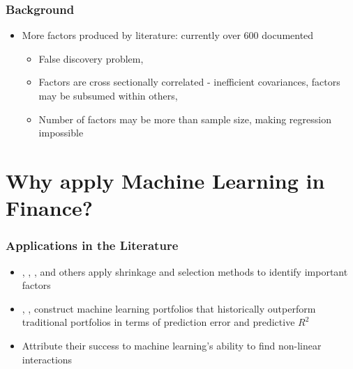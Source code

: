 \documentclass[]{beamer}
\begin{document}
\begin{frame}
\frametitle{Background}
\begin{itemize}
\item More factors produced by literature: currently over 600 documented \citep{harvey_census_2019}

\begin{itemize}
	\item False discovery problem, \citep{harvey__2016}
	
	\item Factors are cross sectionally correlated - inefficient covariances, factors may be subsumed within others, \citep{feng_taming_2019}
	
	\item Number of factors may be more than sample size, making regression impossible
\end{itemize}


\end{itemize}
\end{frame}

\section{Why apply Machine Learning in Finance?}



\begin{frame}
\frametitle{Applications in the Literature}
\begin{itemize}
	\item \cite{kozak_shrinking_2017}, \cite{rapach_forecasting_2013}, \cite{freyberger_dissecting_2017}, and others apply shrinkage and selection methods to identify important factors
	\item \cite{gu_empirical_2018}, \cite{feng_deep_2018}, construct machine learning portfolios that historically outperform traditional portfolios in terms of prediction error and predictive $R^2$
	\item Attribute their success to machine learning's ability to find non-linear interactions
\end{itemize}
\end{frame}
\end{document}
